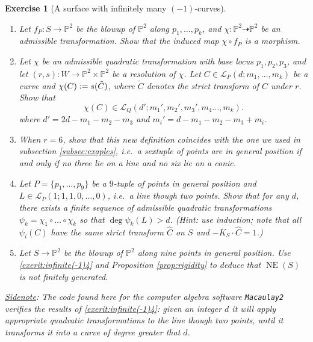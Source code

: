 \documentclass[a4paper,11pt]{amsart}
\newtheorem{exercise}[theorem]{Exercise}
\def\deg{\operatorname{deg}}
\def\NE{\operatorname{NE}}
\newcommand{\PP}{\mathbb{P}}
\newcommand{\defeq}{\vcentcolon=}
\newcommand{\rmap}{\dashrightarrow}
\begin{document}
\begin{exercise}[{A surface with infinitely many $(-1)$-curves}]
	\begin{enumerate}
		\item Let $f_P\colon S \to \PP^2$ be the blowup of $\PP^2$ along $p_1,\dots,p_k$, and $\chi\colon \PP^2 \rmap \PP^2$ be an admissible transformation.
		Show that the induced map $\chi\circ f_P$ is a morphism.
		\item Let $\chi$ be an admissible quadratic transformation with base locus $p_1,p_2,p_3$, and let $(r,s)\colon W \to \PP^2 \times \PP^2$ be a resolution of $\chi$.
		Let $C \in \mathcal{L}_P(d;m_1,\dots,m_k)$ be a curve and $\chi(C) \defeq s(\tilde{C})$, where $\tilde{C}$ denotes the strict transform of $C$ under $r$.
		Show that 
		\[
		\chi(C)  \in \mathcal{L}_Q\left(d'; m_1', m_2', m_3',m_4 \dots,m_k\right).
		\]
		where $d'= 2d-m_1-m_2-m_3$ and  $m_i' = d-m_1-m_2-m_3 + m_i$.
		\item When $r = 6$, show that this new definition coincides with the one we used in subsection \ref{subsec:exaples}, i.e.\ a sextuple of points are in general position if and only if no three lie on a line and no six lie on a conic.
		\item\label{exerit:infinite(-1)4} Let $P = \{p_1,\dots,p_9\}$ be a $9$-tuple of points in general position and $L \in \mathcal{L}_P(1;1,1,0,\dots,0)$, i.e.\ a line though two points.
		Show that for any $d$, there exists a finite sequence of admissible quadratic transformations $\psi_k = \chi_1 \circ \dots \circ \chi_k$ so that $\deg\psi_k(L) > d$.
		{\small(Hint: use induction; note that all $\psi_i(C)$ have the same strict transform $\widehat{C}$ on $S$ and $-K_S\cdot \widehat{C}=1$.)}
		\item Let $S \to \PP^2$ be the blowup of $\PP^2$ along nine points in general position. 
		Use \eqref{exerit:infinite(-1)4} and Proposition \ref{prop:rigidity} to deduce that $\NE(S)$ is not finitely generated.
	\end{enumerate}
	\underline{Sidenote}: The code found here \href{https://s-zikas.github.io/site/teaching/surfacesAndSarkisov/M2Code-quadraticTransformations.txt}{\small \faExternalLink} for the computer algebra software \emph{\texttt{Macaulay2}} \href{https://www.unimelb-macaulay2.cloud.edu.au/#home}{\small \faExternalLink} verifies the results of \eqref{exerit:infinite(-1)4}: given an integer $d$ it will apply appropriate quadratic transformations to the line though two points, until it transforms it into a curve of degree greater that $d$.
\end{exercise}
\end{document}
